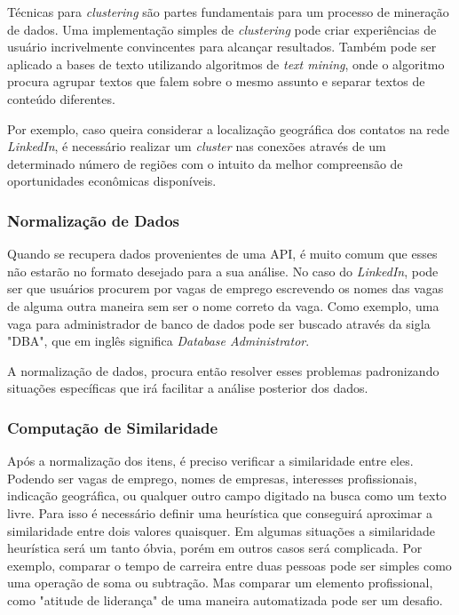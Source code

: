 Técnicas para \textit{clustering} são partes fundamentais para um processo de mineração de dados. Uma implementação simples de \textit{clustering} pode criar experiências de usuário incrivelmente convincentes para alcançar resultados. Também pode ser aplicado a bases de texto utilizando algoritmos de \textit{text mining}, onde o algoritmo procura agrupar textos que falem sobre o mesmo assunto e separar textos de conteúdo diferentes.

Por exemplo, caso queira considerar a localização geográfica dos contatos na rede \textit{LinkedIn}, é necessário realizar um \textit{cluster} nas conexões através de um determinado número de regiões com o intuito da melhor compreensão de oportunidades econômicas disponíveis.

\subsubsection{\textbf{Normalização de Dados}}
Quando se recupera dados provenientes de uma API, é muito comum que esses não estarão no formato desejado para a sua análise. No caso do \textit{LinkedIn}, pode ser que usuários procurem por vagas de emprego escrevendo os nomes das vagas de alguma outra maneira sem ser o nome correto da vaga. Como exemplo, uma vaga para administrador de banco de dados pode ser buscado através da sigla "DBA", que em inglês significa \textit{Database Administrator}.

A normalização de dados, procura então resolver esses problemas padronizando situações específicas que irá facilitar a análise posterior dos dados.

\subsubsection{\textbf{Computação de Similaridade}}
Após a normalização dos itens, é preciso verificar a similaridade entre eles. Podendo ser vagas de emprego, nomes de empresas, interesses profissionais, indicação geográfica, ou qualquer outro campo digitado na busca como um texto livre. Para isso é necessário definir uma heurística que conseguirá aproximar a similaridade entre dois valores quaisquer. Em algumas situações a similaridade heurística será um tanto óbvia, porém em outros casos será complicada. Por exemplo, comparar o tempo de carreira entre duas pessoas pode ser simples como uma operação de soma ou subtração. Mas comparar um elemento profissional, como "atitude de liderança" \space de uma maneira automatizada pode ser um desafio.

